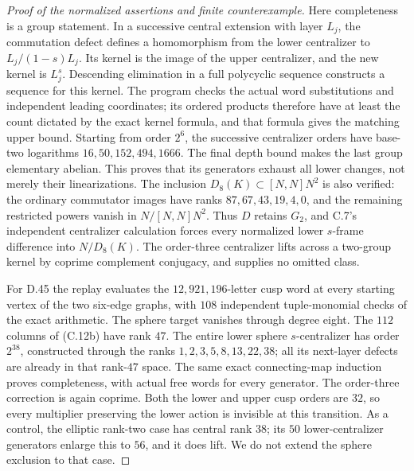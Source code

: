 \begin{proof}[Proof of the normalized assertions and finite counterexample]
Here completeness is a group statement. In a
successive central extension with layer \(L_j\),
the commutation defect defines a homomorphism
from the lower centralizer to \(L_j/(1-s)L_j\).
Its kernel is the image of the upper centralizer,
and the new kernel is \(L_j^s\).
Descending elimination in a full polycyclic sequence
constructs a sequence for this kernel. The program
checks the actual word substitutions and independent
leading coordinates; its ordered products therefore
have at least the count dictated by the exact
kernel formula, and that formula gives the matching
upper bound. Starting from order \(2^6\), the
successive centralizer orders have base-two logarithms
\(16,50,152,494,1666\).
The final depth bound makes the last group elementary
abelian. This proves that its generators exhaust
all lower changes, not merely their linearizations.
The inclusion \(D_8(K)\subset[N,N]N^2\) is also
verified: the ordinary commutator images have ranks
\(87,67,43,19,4,0\), and the remaining restricted
powers vanish in \(N/[N,N]N^2\).
Thus \(D\) retains \(G_2\), and C.7's independent
centralizer calculation forces every normalized
lower \(s\)-frame difference into \(N/D_8(K)\).
The order-three centralizer lifts across a two-group
kernel by coprime complement conjugacy, and supplies
no omitted class.

For D.45 the replay evaluates the
\(12{,}921{,}196\)-letter cusp word at every starting
vertex of the two six-edge graphs, with \(108\)
independent tuple-monomial checks of the exact
arithmetic. The sphere target vanishes through
degree eight. The \(112\) columns of (C.12b) have
rank \(47\). The entire lower sphere
\(s\)-centralizer has order \(2^{38}\), constructed
through the ranks
\(1,2,3,5,8,13,22,38\); all its next-layer defects
are already in that rank-\(47\) space.
The same exact connecting-map induction proves
completeness, with actual free words for every
generator. The order-three correction is again
coprime. Both the lower and upper cusp orders
are \(32\), so every multiplier preserving the
lower action is invisible at this transition.
As a control, the elliptic rank-two case has
central rank \(38\); its \(50\) lower-centralizer
generators enlarge this to \(56\), and it does lift.
We do not extend the sphere exclusion to that case.


\end{proof}
